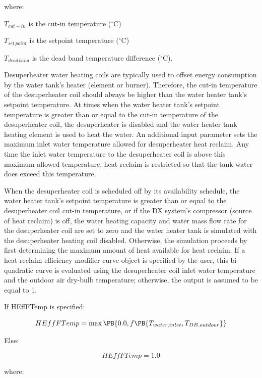 where:

\({T_{cut - in}}\) is the cut-in temperature (\(^{\circ}\)C)

\({T_{set\,point}}\) is the setpoint temperature (\(^{\circ}\)C)

\({T_{dead\,band}}\) is the dead band temperature difference (\(^{\circ}\)C).

Desuperheater water heating coils are typically used to offset energy consumption by the water tank's heater (element or burner). Therefore, the cut-in temperature of the desuperheater coil should always be higher than the water heater tank's setpoint temperature. At times when the water heater tank's setpoint temperature is greater than or equal to the cut-in temperature of the desuperheater coil, the desuperheater is disabled and the water heater tank heating element is used to heat the water. An additional input parameter sets the maximum inlet water temperature allowed for desuperheater heat reclaim. Any time the inlet water temperature to the desuperheater coil is above this maximum allowed temperature, heat reclaim is restricted so that the tank water does exceed this temperature.

When the desuperheater coil is scheduled off by its availability schedule, the water heater tank's setpoint temperature is greater than or equal to the desuperheater coil cut-in temperature, or if the DX system's compressor (source of heat reclaim) is off, the water heating capacity and water mass flow rate for the desuperheater coil are set to zero and the water heater tank is simulated with the desuperheater heating coil disabled. Otherwise, the simulation proceeds by first determining the maximum amount of heat available for heat reclaim. If a heat reclaim efficiency modifier curve object is specified by the user, this bi-quadratic curve is evaluated using the desuperheater coil inlet water temperature and the outdoor air dry-bulb temperature; otherwise, the output is assumed to be equal to 1.

If HEffFTemp is specified:

\begin{equation}
  HEffFTemp = \max\PB{0.0, f\PB{T_{water,inlet},T_{DB,outdoor}}}
\end{equation}

Else:

\begin{equation}
  HEffFTemp = 1.0
\end{equation}

where:

